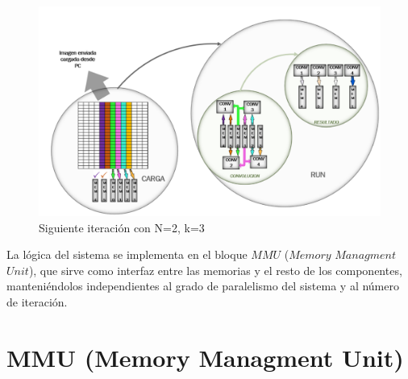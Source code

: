 \begin{figure}
\centering
\includegraphics[scale=0.7]{example_2}
\caption{Siguiente iteración con N=2, k=3}
\label{writingprocess4}
\end{figure}




La lógica del sistema se implementa en el bloque $MMU$ ($Memory$ $Managment$ $Unit$), que sirve como interfaz entre las memorias y el resto de los componentes, 
manteniéndolos independientes al grado de paralelismo del sistema y al número de iteración.

\bigskip

\section {MMU (Memory Managment Unit) }  \label{mmu_subsecc}